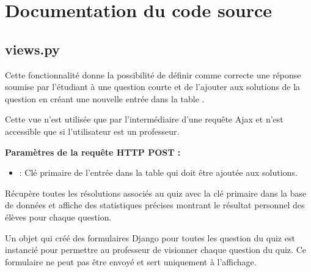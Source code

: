 \documentclass[a4,10pt,french]{sphinxmanual}
\begin{document}
\chapter{Documentation du code source}
\label{source::doc}\label{source:documentation-du-code-source}

\section{views.py}
\label{source:module-quiz.views}\label{source:views-py}

\begin{fulllineitems}
\label{source:quiz.views.add_correct_answer}
Cette fonctionnalité donne la possibilité de définir comme correcte une réponse
soumise par l'étudiant à une question courte et de l'ajouter aux solutions de
la question en créant une nouvelle entrée dans la table .

Cette vue n'est utilisée que par l'intermédiaire d'une requête Ajax et n'est
accessible que si l'utilisateur est un professeur.

\textbf{Paramètres de la requête HTTP POST :}
\begin{itemize}
\item {} 
 : Clé primaire de l'entrée dans la table  qui doit être ajoutée aux solutions.

\end{itemize}

\end{fulllineitems}


\begin{fulllineitems}
\label{source:quiz.views.advanced_stats}
Récupère toutes les résolutions associés au quiz avec la clé primaire  dans la base de données et affiche
des statistiques précises montrant le résultat personnel des élèves pour chaque question.

Un objet  qui créé des formulaires Django pour toutes les question
du quiz est instancié pour permettre au professeur de visionner 
chaque question du quiz. Ce formulaire ne peut pas être envoyé et sert
uniquement à l'affichage.

\end{fulllineitems}
\end{document}

